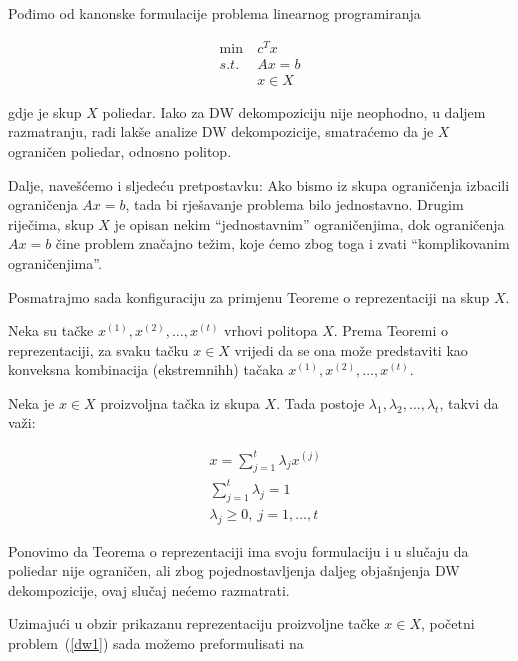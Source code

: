 \documentclass[a4paper, utf8, 11pt, colorlinks]{book}
\begin{document}
 Pođimo od kanonske formulacije problema linearnog programiranja
 
  \begin{equation}
 	\begin{aligned}\label{dw1}
 		\min\  &c^Tx\\
 		s.t.\  &Ax=b\\
 		&x \in X
 	\end{aligned}
 \end{equation}
 
 gdje je skup $X$ poliedar. Iako za DW dekompoziciju nije neophodno, u daljem razmatranju, radi lakše analize DW dekompozicije, smatraćemo da je $X$ ograničen poliedar, odnosno politop.
 
 Dalje, navešćemo i sljedeću pretpostavku: Ako bismo iz skupa ograničenja izbacili ograničenja $Ax=b$, tada bi rješavanje problema bilo jednostavno. Drugim riječima, skup $X$ je opisan nekim ``jednostavnim'' ograničenjima, dok ograničenja $Ax=b$ čine problem značajno težim, koje ćemo zbog toga i zvati ``komplikovanim ograničenjima''. 
 
 Posmatrajmo sada konfiguraciju za primjenu Teoreme o reprezentaciji na skup $X$.
 
 Neka su tačke $x^{(1)},x^{(2)},\dots,x^{(t)}$ vrhovi politopa $X$.  
 Prema Teoremi o reprezentaciji, za svaku tačku $x\in X$ vrijedi da se ona može predstaviti kao konveksna kombinacija (ekstremnihh) tačaka $x^{(1)},x^{(2)},\dots,x^{(t)}$.
 
 Neka je  $x \in X$ proizvoljna tačka iz skupa $X$.  Tada postoje $\lambda_1,\lambda_2,\ldots,\lambda_t$, takvi da važi:
 
 \begin{equation}
 	\begin{aligned}
 		&x = \sum_{j=1}^t\lambda_jx^{(j)}\\
 		 &\sum_{j=1}^t\lambda_j = 1\\
 		&\lambda_j\geqslant 0,\ j = 1,\ldots,t
 	\end{aligned}
 \end{equation}
 
 Ponovimo da Teorema o reprezentaciji ima svoju formulaciju i u slučaju da poliedar nije ograničen, ali zbog pojednostavljenja daljeg objašnjenja DW dekompozicije, ovaj slučaj nećemo razmatrati.
 
 Uzimajući u obzir prikazanu reprezentaciju proizvoljne tačke $x\in X$, početni problem~(\ref{dw1}) sada možemo preformulisati na
 
\end{document}
